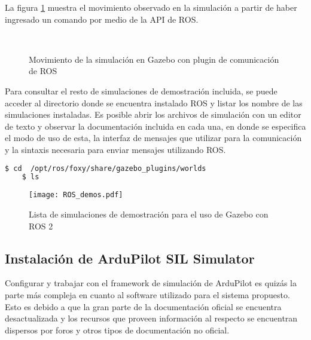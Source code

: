 La figura \ref{fig:rossims} muestra el movimiento observado en la simulación  a partir de haber ingresado un comando por medio de la API de ROS.

\begin{figure}[ht]
    \centering
    \hfill
    \\
    \hfill
    \caption{Movimiento de la simulación en Gazebo con plugin de comunicación de ROS}
    \label{fig:rossims}
\end{figure}


Para consultar el resto de simulaciones de demostración incluida, se puede acceder al directorio donde se encuentra instalado ROS y listar los nombre de las simulaciones instaladas. Es posible abrir los archivos de simulación con un editor de texto y observar la documentación incluida en cada una, en donde se especifica el modo de uso de esta, la interfaz de mensajes que utilizar para la comunicación y la sintaxis necesaria para enviar mensajes utilizando ROS.

\begin{lstlisting}[language = bash]
    $ cd  /opt/ros/foxy/share/gazebo_plugins/worlds
    $ ls 
\end{lstlisting}

\begin{figure}[ht]
    \centering
    \texttt{[image: ROS\_demos.pdf]}
    \caption{Lista de simulaciones de demostración para el uso de Gazebo con ROS 2}
    \label{fig:ROS_demos}
\end{figure}

\subsection{Instalación de ArduPilot SIL Simulator}
Configurar y trabajar con el framework de simulación de ArduPilot es quizás la parte más compleja en cuanto al software utilizado para el sistema propuesto. Esto es debido a que la gran parte de la documentación oficial se encuentra desactualizada y los recursos que proveen información al respecto se encuentran dispersos por foros y otros tipos de documentación no oficial. 

